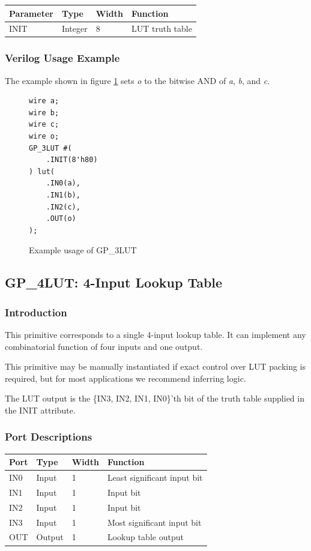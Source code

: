 \documentclass{article}
\begin{document}
\begin{tabularx}{4in}{|l|l|l|X|}
\hline
{\bfseries Parameter} & {\bfseries Type} & {\bfseries Width} & {\bfseries Function} \\
\hline
INIT & Integer & 8 & LUT truth table \\
\hline
\end{tabularx}

\subsubsection{Verilog Usage Example}

The example shown in figure \ref{gp-3LUT-example} sets \emph{o} to the bitwise AND of \emph{a}, \emph{b}, and \emph{c}.

\begin{figure}[h]
\begin{lstlisting}
wire a;
wire b;
wire c;
wire o;
GP_3LUT #(
	.INIT(8'h80)
) lut(
	.IN0(a),
	.IN1(b),
	.IN2(c),
	.OUT(o)
);
\end{lstlisting}
\caption{Example usage of GP\_3LUT}
\label{gp-3LUT-example}
\end{figure}


\pagebreak
\subsection{GP\_4LUT: 4-Input Lookup Table}

\subsubsection{Introduction}
This primitive corresponds to a single 4-input lookup table. It can implement any combinatorial function of four 
inputs and one output.

This primitive may be manually instantiated if exact control over LUT packing is required, but for most applications we 
recommend inferring logic.

The LUT output is the \{IN3, IN2, IN1, IN0\}'th bit of the truth table supplied in the INIT attribute.

\subsubsection{Port Descriptions}

\begin{tabularx}{4in}{|l|l|l|X|}
\hline
{\bfseries Port} & {\bfseries Type} & {\bfseries Width} & {\bfseries Function} \\
\hline
IN0 & Input & 1 & Least significant input bit \\
\hline
IN1 & Input & 1 & Input bit \\
\hline
IN2 & Input & 1 & Input bit \\
\hline
IN3 & Input & 1 & Most significant input bit \\
\hline
OUT & Output & 1 & Lookup table output \\
\hline
\end{tabularx}
\end{document}
